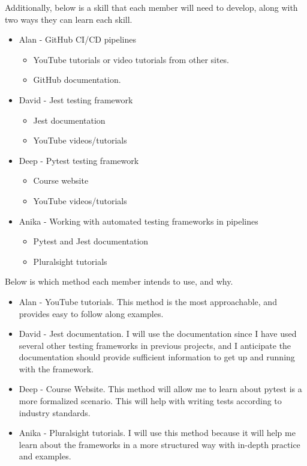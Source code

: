\documentclass[12pt, titlepage]{article}
\begin{document}
Additionally, below is a skill that each member will need to develop, along with two ways they can learn each skill.
\begin{itemize}
\item Alan - GitHub CI/CD pipelines
\begin{itemize}
\item YouTube tutorials or video tutorials from other sites.
\item GitHub documentation.
\end{itemize}
\item David - Jest testing framework
\begin{itemize}
  \item Jest documentation
  \item YouTube videos/tutorials 
\end{itemize}
\item Deep - Pytest testing framework
\begin{itemize}
  \item Course website
  \item YouTube videos/tutorials 
\end{itemize}
\item Anika - Working with automated testing frameworks in pipelines
  \begin {itemize}
    \item Pytest and Jest documentation
    \item Pluralsight tutorials
  \end {itemize}
\end{itemize}

Below is which method each member intends to use, and why.
\begin{itemize}
\item Alan - YouTube tutorials. This method is the most approachable, and provides easy to follow along examples.
\item David - Jest documentation. I will use the documentation since I have used several other testing frameworks in previous projects, and I anticipate the documentation should provide sufficient information to get up and running with the framework.
\item Deep - Course Website. This method will allow me to learn about pytest is a more formalized scenario. This will help with writing tests according to industry standards.
\item Anika - Pluralsight tutorials. I will use this method because it will help me learn about the frameworks in a more structured way with in-depth practice and examples.
\end{itemize}
\end{document}
